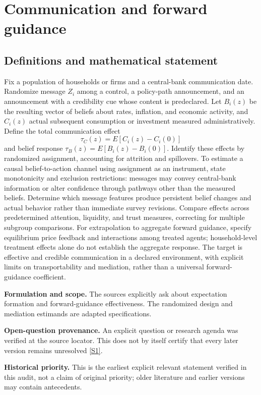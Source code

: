 \documentclass[11pt]{article}
\newcommand{\sref}[2]{\hyperlink{source:#1:#2}{[S#2]}}
\begin{document}
\section*{Communication and forward guidance}\label{30007531}
\subsection{Definitions and mathematical statement}
Fix a population of households or firms and a central-bank communication date. Randomize message \(Z_i\) among a control, a policy-path announcement, and an announcement with a credibility cue whose content is predeclared. Let \(B_i(z)\) be the resulting vector of beliefs about rates, inflation, and economic activity, and \(C_i(z)\) actual subsequent consumption or investment measured administratively. Define the total communication effect
\[
\tau_C(z)=E[C_i(z)-C_i(0)]
\]
and belief response \(\tau_B(z)=E[B_i(z)-B_i(0)]\). Identify these effects by randomized assignment, accounting for attrition and spillovers. To estimate a causal belief-to-action channel using assignment as an instrument, state monotonicity and exclusion restrictions: messages may convey central-bank information or alter confidence through pathways other than the measured beliefs.
Determine which message features produce persistent belief changes and actual behavior rather than immediate survey revisions. Compare effects across predetermined attention, liquidity, and trust measures, correcting for multiple subgroup comparisons. For extrapolation to aggregate forward guidance, specify equilibrium price feedback and interactions among treated agents; household-level treatment effects alone do not establish the aggregate response. The target is effective and credible communication in a declared environment, with explicit limits on transportability and mediation, rather than a universal forward-guidance coefficient.

\par\textbf{Formulation and scope.} The sources explicitly ask about expectation formation and forward-guidance effectiveness. The randomized design and mediation estimands are adapted specifications.

\par\textbf{Open-question provenance.} An explicit question or research agenda was verified at the source locator. This does not by itself certify that every later version remains unresolved \sref{30007531}{1}.

\par\textbf{Historical priority.} This is the earliest explicit relevant statement verified in this audit, not a claim of original priority; older literature and earlier versions may contain antecedents.
\end{document}
